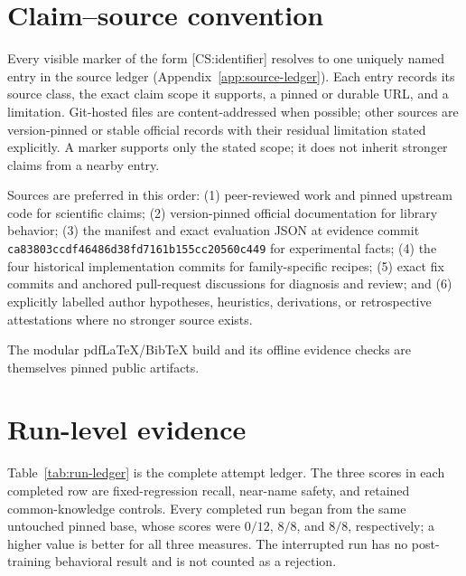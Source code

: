 \section{Claim--source convention}
\label{app:claim-source-convention}

Every visible marker of the form \textsf{[CS:identifier]} resolves to one
uniquely named entry in the source ledger (Appendix~\ref{app:source-ledger}).
Each entry records its source class, the exact claim scope it supports, a
pinned or durable URL, and a limitation. Git-hosted files are content-addressed
when possible; other sources are version-pinned or stable official records with
their residual limitation stated explicitly. A marker supports only the stated
scope; it does not inherit stronger claims from a nearby entry.

Sources are preferred in this order: (1) peer-reviewed work and pinned upstream
code for scientific claims; (2) version-pinned official documentation for
library behavior; (3) the manifest and exact evaluation JSON at evidence commit
\texttt{ca83803ccdf46486d38fd7161b155cc20560c449} for experimental facts;
(4) the four historical implementation commits for family-specific recipes;
(5) exact fix commits and anchored pull-request discussions for diagnosis and
review; and (6) explicitly labelled author hypotheses, heuristics, derivations,
or retrospective attestations where no stronger source exists.

The modular pdfLaTeX/BibTeX build and its offline evidence checks are themselves
pinned public artifacts.

\section{Run-level evidence}
\label{app:run-evidence}

Table~\ref{tab:run-ledger} is the complete attempt ledger.  The three scores
in each completed row are fixed-regression recall, near-name safety, and
retained common-knowledge controls.  Every completed run began from the same
untouched pinned base, whose scores were $0/12$, $8/8$, and $8/8$,
respectively; a higher value is better for all three measures.  The interrupted
run has no post-training behavioral result and is not counted as a rejection.

